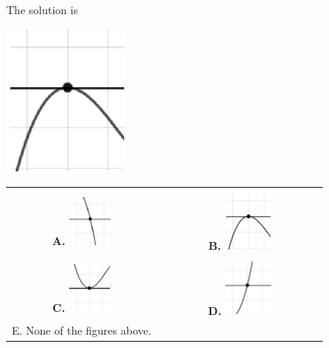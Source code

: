 \documentclass{extbook}[14pt]
\begin{document}
 
 The solution is  
 \begin{center} \includegraphics[width=0.3\textwidth]{../Figures/polyZeroBehaviorBC.png} \end{center}\begin{tabular}{|c|c|} 
\hline 
 & \tabularnewline 
 \textbf{A.} \includegraphics[width=0.3\textwidth]{../Figures/polyZeroBehaviorAC.png} & \textbf{B.} \includegraphics[width=0.3\textwidth]{../Figures/polyZeroBehaviorBC.png} \tabularnewline 
\hline 
 & \tabularnewline 
 \textbf{C.} \includegraphics[width=0.3\textwidth]{../Figures/polyZeroBehaviorCC.png} & \textbf{D.} \includegraphics[width=0.3\textwidth]{../Figures/polyZeroBehaviorDC.png} \tabularnewline 
\hline 
 E. None of the figures above. & \tabularnewline 
\hline 
 \end{tabular} 
 
\end{document}
